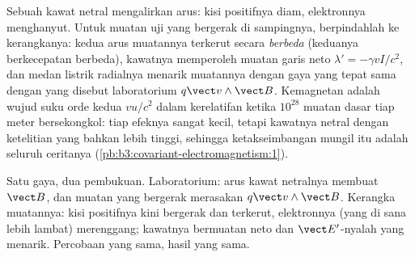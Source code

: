 \begin{example}\label{ex:b3:covariant-electromagnetism:wire}
Sebuah kawat netral mengalirkan arus: kisi positifnya diam, elektronnya
menghanyut. Untuk muatan uji yang bergerak di sampingnya, berpindahlah
ke kerangkanya: kedua arus muatannya terkerut secara \emph{berbeda}
(keduanya berkecepatan berbeda), kawatnya memperoleh muatan garis neto
$\lambda' =
-\gamma vI/c^2$, dan medan listrik radialnya menarik
muatannya dengan gaya yang tepat sama dengan yang disebut laboratorium
$q\vect v\wedge\vect B$. Kemagnetan adalah wujud suku orde kedua
$v u/c^2$ dalam kerelatifan ketika $10^{28}$ muatan dasar tiap meter
bersekongkol: tiap efeknya sangat kecil, tetapi kawatnya netral dengan
ketelitian yang bahkan lebih tinggi, sehingga ketakseimbangan mungil itu
adalah seluruh ceritanya
(\cref{pb:b3:covariant-electromagnetism:1}).
\end{example}

\begin{omfigure}

{\small Satu gaya, dua pembukuan. Laboratorium: arus kawat netralnya
membuat $\vect B$, dan muatan yang bergerak merasakan $q\vect v\wedge\vect B$.
Kerangka muatannya: kisi positifnya kini bergerak dan terkerut,
elektronnya (yang di sana lebih lambat) merenggang; kawatnya bermuatan
neto dan $\vect E'$-nyalah yang menarik. Percobaan yang sama, hasil yang
sama.}
\end{omfigure}

